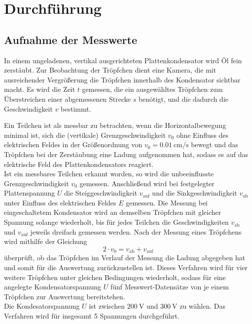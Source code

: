 \section{Durchf\"uhrung}
\label{sec:Durchfuehrung}

\subsection{Aufnahme der Messwerte}
In einem ungeladenen, vertikal ausgerichteten Plattenkondensator wird Öl fein zerstäubt.
Zur Beobachtung der Tröpfchen dient eine Kamera, die mit ausreichender Vergrößerung die Tröpfchen innerhalb des Kondensator sichtbar macht.
Es wird die Zeit $t$ gemessen, die ein ausgewähltes Tröpfchen zum Überstreichen einer abgemessenen Strecke $s$ benötigt, und die dadurch die Geschwindigkeit $v$ bestimmt.

Ein Teilchen ist als messbar zu betrachten, wenn die Horizontalbewegung minimal ist, 
sich die (vertikale) Grenzgeschwindigkeit $v_0$ ohne Einfluss des elektrischen Feldes in der Größenordnung von $v_0=\SI{0.01}{\centi\meter\per\second}$ bewegt und 
das Tröpfchen bei der Zerstäubung eine Ladung aufgenommen hat, sodass es auf das elektrische Feld des Plattenkondensators reagiert.\\
Ist ein messbares Teilchen erkannt worden, so wird die unbeeinflusste Grenzgeschwindigkeit $v_0$ gemessen. 
Anschließend wird bei festgelegter Plattenspannung $U$ die Steiggeschwindigkeit $v_\text{auf}$ und die Sinkgeschwindigkeit $v_\text{ab}$ unter Einfluss des elektrischen Feldes $E$ gemessen.
Die Messung bei eingeschaltetem Kondensator wird an demselben Tröpfchen mit gleicher Spannung solange wiederholt, bis für jedes Teilchen die   Geschwindigkeiten $v_\text{ab}$ und $v_\text{auf}$ jeweils dreifach gemessen werden.
Nach der Messung eines Tröpfchens wird mithilfe der Gleichung
\begin{equation}
	2\cdot v_0=v_\text{ab}+v_\text{auf}
	\label{eq:plaus_test}
\end{equation}
überprüft, ob das Tröpfchen im Verlauf der Messung die Ladung abgegeben hat und somit für die Auswertung zurückzustellen ist.
Dieses Verfahren wird für vier weitere Tröpfchen unter gleichen Bedingungen wiederholt, sodass für eine angelegte Kondensatorspannung $U$ fünf Messwert-Datensätze von je einem Tröpfchen zur Auswertung bereitstehen.\\
Die Kondesatorspannung $U$ ist zwischen $\SI{200}{\volt}$ und $\SI{300}{\volt}$ zu wählen.
Das Verfahren wird für insgesamt 5 Spannungen durchgeführt.

